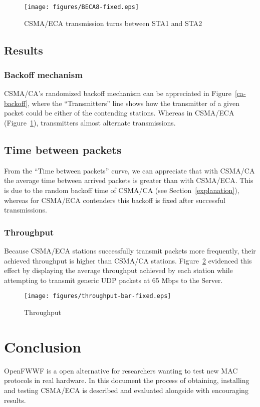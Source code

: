 \documentclass[conference]{IEEEtran}
\begin{document}
\begin{figure}[htbp]
\centering
  \texttt{[image: figures/BECA8-fixed.eps]}
  \caption{CSMA/ECA transmission turns between STA1 and STA2}
  \label{eca-backoff}
\end{figure}

\subsection{Results}

\subsubsection*{Backoff mechanism}
CSMA/CA's randomized backoff mechanism can be appreciated in Figure~\ref{ca-backoff}, where the ``Transmitters'' line shows how the transmitter of a given packet could be either of the contending stations. Whereas in CSMA/ECA (Figure~\ref{eca-backoff}), transmitters almost alternate transmissions.

\subsection*{Time between packets}
From the ``Time between packets'' curve, we can appreciate that with CSMA/CA the average time between arrived packets is greater than with CSMA/ECA. This is due to the random backoff time of CSMA/CA (see Section~\ref{explanation}), whereas for CSMA/ECA contenders this backoff is fixed after successful transmissions.

\subsubsection*{Throughput}
Because CSMA/ECA stations successfully transmit packets more frequently, their achieved throughput is higher than CSMA/CA stations. 
Figure~\ref{throughput} evidenced this effect by displaying the average throughput achieved by each station while attempting to transmit generic UDP packets at 65 Mbps to the Server. 

\begin{figure}[htbp]
\centering
  \texttt{[image: figures/throughput-bar-fixed.eps]}
  \caption{Throughput}
  \label{throughput}
\end{figure}


\section{Conclusion}
OpenFWWF is a open alternative for researchers wanting to test new MAC protocols in real hardware. In this document the process of obtaining, installing and testing CSMA/ECA is described and evaluated alongside with encouraging results.
\end{document}
